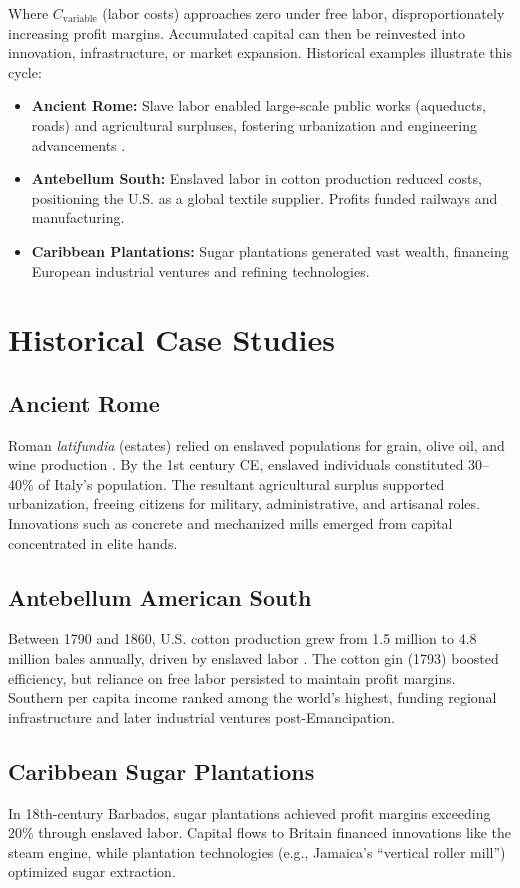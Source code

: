 \documentclass[12pt]{article}
\begin{document}
Where \( C_{\text{variable}} \) (labor costs) approaches zero under free labor, disproportionately increasing profit margins. Accumulated capital can then be reinvested into innovation, infrastructure, or market expansion. Historical examples illustrate this cycle:

\begin{itemize}
    \item \textbf{Ancient Rome:} Slave labor enabled large-scale public works (aqueducts, roads) and agricultural surpluses, fostering urbanization and engineering advancements \cite{scheidel2012}.
    \item \textbf{Antebellum South:} Enslaved labor in cotton production reduced costs, positioning the U.S. as a global textile supplier. Profits funded railways and manufacturing.
    \item \textbf{Caribbean Plantations:} Sugar plantations generated vast wealth, financing European industrial ventures and refining technologies.
\end{itemize}

\section{Historical Case Studies}
\subsection{Ancient Rome}
Roman \emph{latifundia} (estates) relied on enslaved populations for grain, olive oil, and wine production \cite{temin2013}. By the 1st century CE, enslaved individuals constituted 30--40\% of Italy's population. The resultant agricultural surplus supported urbanization, freeing citizens for military, administrative, and artisanal roles. Innovations such as concrete and mechanized mills emerged from capital concentrated in elite hands.

\subsection{Antebellum American South}
Between 1790 and 1860, U.S. cotton production grew from 1.5 million to 4.8 million bales annually, driven by enslaved labor \cite{fogel1974}. The cotton gin (1793) boosted efficiency, but reliance on free labor persisted to maintain profit margins. Southern per capita income ranked among the world's highest, funding regional infrastructure and later industrial ventures post-Emancipation.

\subsection{Caribbean Sugar Plantations}
In 18th-century Barbados, sugar plantations achieved profit margins exceeding 20\% through enslaved labor. Capital flows to Britain financed innovations like the steam engine, while plantation technologies (e.g., Jamaica's ``vertical roller mill'') optimized sugar extraction.
\end{document}
